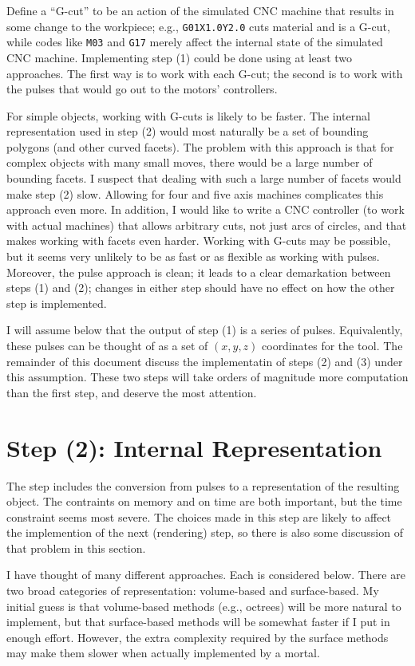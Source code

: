 \documentclass[titlepage,oneside,10pt]{article}
\begin{document}
Define a ``G-cut'' to be an action of the simulated
CNC machine that results in some change to the workpiece; e.g.,
\verb=G01X1.0Y2.0= cuts material and is a G-cut, while codes like
\verb=M03= and \verb=G17= merely affect the internal state of the simulated
CNC machine. Implementing step (1) could be done using at least two
approaches. The first way is to work with each G-cut; the second is to
work with the pulses that would go out to the motors' controllers. 

For simple objects, working with G-cuts is likely to be faster. The
internal representation used in step (2) would most 
naturally be a set of bounding polygons (and other curved
facets). The problem with this approach is that for complex objects
with many small moves, there would be a large number of bounding
facets. I suspect that dealing with such a large number of facets would
make step (2) slow. Allowing for four and five axis machines
complicates this approach even more. In addition, I would like to
write a CNC controller (to work with actual machines) that allows
arbitrary cuts, not just arcs of circles, and that makes working with
facets even harder. Working with G-cuts may be possible, but it seems
very unlikely to be as fast or as flexible as working with
pulses. Moreover, the pulse approach is clean; it leads to a clear
demarkation between steps (1) and (2); changes in either step should
have no effect on how the other step is implemented.

I will assume below that the output of step (1) is a series of
pulses. Equivalently, these pulses can be thought of as a set of
$(x,y,z)$ coordinates for the tool. The remainder of this document
discuss the implementatin of steps (2) and (3) under this
assumption. These two steps will take orders of magnitude more
computation than the first step, and deserve the most attention.

\section{Step (2): Internal Representation}

The step includes the conversion from pulses to a representation of
the resulting object. The contraints on memory and on time are both
important, but the time constraint seems most severe. The choices made
in this step are likely to affect the implemention of the next
(rendering) step, so there is also some discussion of that problem in
this section.

I have thought of many different approaches. Each is considered
below. There are two broad categories of representation: volume-based
and surface-based. My initial guess is that volume-based methods
(e.g., octrees) will be more natural to implement, but that
surface-based methods will be somewhat faster if I put in enough
effort. However, the extra complexity required by the surface
methods may make them slower when actually implemented by a mortal.
\end{document}
